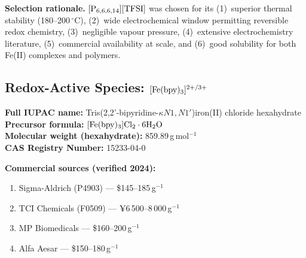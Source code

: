 \documentclass[11pt,a4paper]{article}
\begin{document}
\textbf{Selection rationale.} $[\ce{P_{6,6,6,14}}][\ce{TFSI}]$ was chosen for its (1)~superior thermal stability (180--200\,$^\circ$C), (2)~wide electrochemical window permitting reversible redox chemistry, (3)~negligible vapour pressure, (4)~extensive electrochemistry literature, (5)~commercial availability at scale, and (6)~good solubility for both Fe(II) complexes and polymers.

\subsection{Redox-Active Species: $[\ce{Fe(bpy)3}]^{2+/3+}$}
\textbf{Full IUPAC name:} Tris(2,2'-bipyridine-$\kappa N1,N1'$)iron(II) chloride hexahydrate\\
\textbf{Precursor formula:} $[\ce{Fe(bpy)3}]\mathrm{Cl_2\cdot6H_2O}$\\
\textbf{Molecular weight (hexahydrate):} 859.89\,g\,mol$^{-1}$\\
\textbf{CAS Registry Number:} 15233-04-0

\textbf{Commercial sources (verified 2024):}
\begin{enumerate}[leftmargin=1.5em]
    \item Sigma-Aldrich (P4903) --- \$145--185\,g$^{-1}$
    \item TCI Chemicals (F0509) --- ¥6\,500--8\,000\,g$^{-1}$
    \item MP Biomedicals --- \$160--200\,g$^{-1}$
    \item Alfa Aesar --- \$150--180\,g$^{-1}$
\end{enumerate}
\end{document}
